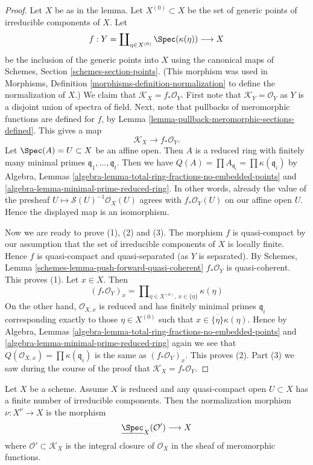 \begin{proof}
Let $X$ be as in the lemma. Let $X^{(0)} \subset X$ be the
set of generic points of irreducible components of $X$. Let
$$
f :
Y = \coprod\nolimits_{\eta \in X^{(0)}} \Spec(\kappa(\eta))
\longrightarrow
X
$$
be the inclusion of the generic points into $X$ using the
canonical maps of Schemes, Section \ref{schemes-section-points}.
(This morphism was used in
Morphisms, Definition \ref{morphisms-definition-normalization}
to define the normalization of $X$.)
We claim that $\mathcal{K}_X = f_*\mathcal{O}_Y$.
First note that $\mathcal{K}_Y = \mathcal{O}_Y$ as $Y$ is a disjoint
union of spectra of field. Next, note that pullbacks of meromorphic
functions are defined for $f$, by
Lemma \ref{lemma-pullback-meromorphic-sections-defined}.
This gives a map
$$
\mathcal{K}_X \longrightarrow f_*\mathcal{O}_Y.
$$
Let $\Spec(A) = U \subset X$ be an affine open.
Then $A$ is a reduced ring with finitely many minimal
primes $\mathfrak q_1, \ldots, \mathfrak q_t$. Then we have
$Q(A) = \prod A_{\mathfrak q_i} = \prod \kappa(\mathfrak q_i)$
by Algebra, Lemmas \ref{algebra-lemma-total-ring-fractions-no-embedded-points}
and \ref{algebra-lemma-minimal-prime-reduced-ring}.
In other words, already the value of the presheaf
$U \mapsto \mathcal{S}(U)^{-1}\mathcal{O}_X(U)$ agrees with
$f_*\mathcal{O}_Y(U)$ on our affine open $U$. Hence the displayed
map is an isomorphism.

\medskip\noindent
Now we are ready to prove (1), (2) and (3).
The morphism $f$ is quasi-compact by our assumption
that the set of irreducible components of $X$ is locally finite.
Hence $f$ is quasi-compact and quasi-separated (as $Y$ is separated).
By Schemes, Lemma \ref{schemes-lemma-push-forward-quasi-coherent}
$f_*\mathcal{O}_Y$ is quasi-coherent.
This proves (1). Let $x \in X$. Then
$$
(f_*\mathcal{O}_Y)_x
=
\prod\nolimits_{\eta \in X^{(0)}, \ x \in \overline{\{\eta\}}} \kappa(\eta)
$$
On the other hand, $\mathcal{O}_{X, x}$
is reduced and has finitely minimal primes $\mathfrak q_i$ corresponding
exactly to those $\eta \in X^{(0)}$ such that
$x \in \overline{\{\eta\}} \kappa(\eta)$. Hence by
Algebra, Lemmas \ref{algebra-lemma-total-ring-fractions-no-embedded-points}
and \ref{algebra-lemma-minimal-prime-reduced-ring} again
we see that
$Q(\mathcal{O}_{X, x}) = \prod \kappa(\mathfrak q_i)$ is the
same as $(f_*\mathcal{O}_Y)_x$. This proves (2).
Part (3) we saw during the course of the proof that
$\mathcal{K}_X = f_*\mathcal{O}_Y$.
\end{proof}

\begin{lemma}
\label{lemma-reduced-normalization}
Let $X$ be a scheme.
Assume $X$ is reduced and any quasi-compact open $U \subset X$
has a finite number of irreducible components.
Then the normalization morphism $\nu : X^\nu \to X$ is the
morphism
$$
\underline{\Spec}_X(\mathcal{O}') \longrightarrow X
$$
where $\mathcal{O}' \subset \mathcal{K}_X$ is the integral
closure of $\mathcal{O}_X$ in the sheaf of meromorphic functions.
\end{lemma}


